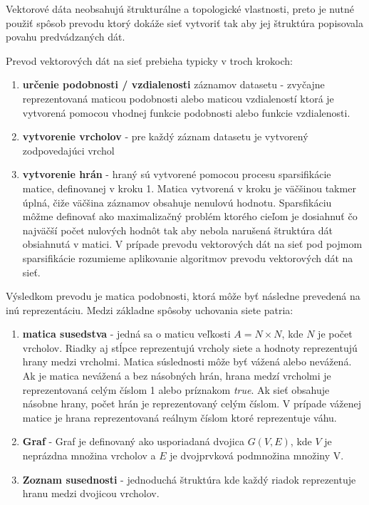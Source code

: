 \documentclass[slovak,master,dept460,male,cpp,cpdeclaration]{diploma}
\begin{document}
Vektorové dáta neobsahujú štrukturálne a topologické vlastnosti, preto je nutné použiť spôsob prevodu ktorý dokáže sieť vytvoriť  tak aby jej štruktúra popisovala povahu predvádzaných dát.

Prevod vektorových dát na sieť prebieha typicky v troch krokoch:
\begin{enumerate}
\item  \textbf{určenie podobnosti / vzdialenosti} záznamov datasetu - zvyčajne reprezentovaná maticou podobnosti alebo maticou vzdialeností ktorá je vytvorená pomocou vhodnej funkcie podobnosti alebo funkcie vzdialenosti.
\item \textbf{vytvorenie vrcholov} - pre každý záznam datasetu je vytvorený zodpovedajúci vrchol
\item \textbf{vytvorenie hrán} - hraný sú vytvorené pomocou procesu sparsifikácie matice, definovanej v kroku 1. Matica vytvorená v kroku je väčšinou takmer úplná, čiže väčšina záznamov obsahuje nenulovú hodnotu. Sparsfikáciu môžme definovať ako maximalizačný problém ktorého cieľom je dosiahnuť čo najväčší počet nulových hodnôt tak aby nebola narušená štruktúra dát obsiahnutá v matici. V prípade prevodu vektorových dát na sieť pod pojmom sparsifikácie rozumieme aplikovanie algoritmov prevodu vektorových dát na sieť.

\end{enumerate}
Výsledkom prevodu je matica podobnosti, ktorá môže byť následne prevedená na inú reprezentáciu. Medzi základne spôsoby uchovania siete patria:\label{graph_representation}
\begin{enumerate}
\item \textbf{matica susedstva} - jedná sa o maticu veľkosti $A = N \times N$, kde $N$ je počet vrcholov. Riadky aj stĺpce reprezentujú vrcholy siete a  hodnoty reprezentujú hrany medzi vrcholmi. Matica súslednosti môže byť vážená alebo nevážená. Ak je matica nevážená a bez násobných hrán, hrana medzí vrcholmi je reprezentovaná celým číslom 1 alebo príznakom \textit{true}. Ak sieť obsahuje násobne hrany, počet hrán je reprezentovaný celým číslom. V prípade váženej matice je hrana reprezentovaná reálnym číslom ktoré reprezentuje  váhu.
\item  \textbf{Graf} - Graf je definovaný ako usporiadaná dvojica $G(V, E)$, kde $V$ je neprázdna množina vrcholov a $E$ je dvojprvková podmnožina množiny V.
\item \textbf{Zoznam susednosti} - jednoduchá štruktúra kde každý riadok reprezentuje hranu medzi dvojicou vrcholov.
\end{enumerate}
\end{document}
